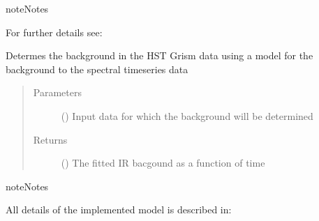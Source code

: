 \documentclass[a4paper,10pt,english]{sphinxmanual}
\begin{document}
\begin{fulllineitems}
\begin{fulllineitems}
\begin{sphinxadmonition}{note}{Notes}

For further details see:
\begin{quote}

\end{quote}
\end{sphinxadmonition}

\end{fulllineitems}


\begin{fulllineitems}
\label{\detokenize{cascade.instruments:cascade.instruments.instruments.HSTWFC3._fit_background}}
Determes the background in the HST Grism data using a model for the
background to the spectral timeseries data
\begin{quote}\begin{description}
\item[{Parameters}] \leavevmode
{} () \textendash{} Input data for which the background will be determined

\item[{Returns}] \leavevmode
{} () \textendash{} The fitted IR bacgound as a function of time

\end{description}\end{quote}

\begin{sphinxadmonition}{note}{Notes}

All details of the implemented model is described in:

\end{sphinxadmonition}

\end{fulllineitems}



\end{fulllineitems}
\end{document}
